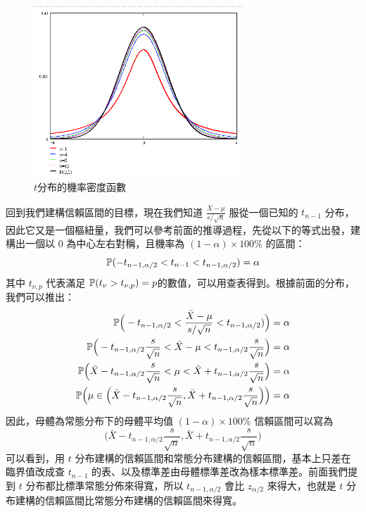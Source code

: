     \begin{figure}[htbp]
        \centering
        \includegraphics[trim={0 0 0 0.5cm},clip,width=0.7\textwidth]{figures/05-Confidence_interval/student.png}
        \caption{$t$分布的機率密度函數}
        \label{fig:student}
    \end{figure}

    回到我們建構信賴區間的目標，現在我們知道 $\frac{\bar{X}-\mu}{s/\sqrt{n}}$ 服從一個已知的 $t_{n-1}$ 分布，因此它又是一個樞紐量，我們可以參考前面的推導過程，先從以下的等式出發，建構出一個以 0 為中心左右對稱，且機率為 $(1-\alpha)\times 100\%$ 的區間：
     \[\mathbb{P}(-t_{n-1, \alpha/2} < t_{n-1} < t_{n-1, \alpha/2}) = \alpha\]
    其中 $t_{\nu, p}$ 代表滿足 $\mathbb{P}(t_{\nu} > t_{\nu, p}) = p$的數值，可以用查表得到。根據前面的分布，我們可以推出：
    \begin{align*}
        \mathbb{P}\Big(-t_{n-1, \alpha/2} < \frac{\bar{X} - \mu}{s/\sqrt{n}} < t_{n-1, \alpha/2})\Big) &= \alpha\\
        \mathbb{P}\Big(-t_{n-1, \alpha/2}\frac{s}{\sqrt{n}} < \bar{X} - \mu < t_{n-1, \alpha/2}\frac{s}{\sqrt{n}}\Big) &= \alpha\\
        \mathbb{P}\Big(\bar{X}-t_{n-1, \alpha/2}\frac{s}{\sqrt{n}}< \mu < \bar{X} + t_{n-1, \alpha/2}\frac{s}{\sqrt{n}}\Big) &= \alpha\\
        \mathbb{P}\Big(\mu \in \Big(\bar{X}-t_{n-1, \alpha/2}\frac{s}{\sqrt{n}},  \bar{X} + t_{n-1, \alpha/2}\frac{s}{\sqrt{n}}\Big)\Big) &= \alpha
    \end{align*}
    因此，母體為常態分布下的母體平均值 $(1-\alpha)\times 100\%$ 信賴區間可以寫為
    \[\Big(\bar{X}-t_{n-1, \alpha/2}\frac{s}{\sqrt{n}},  \bar{X} + t_{n-1, \alpha/2}\frac{s}{\sqrt{n}}\Big)\]
    可以看到，用 $t$ 分布建構的信賴區間和常態分布建構的信賴區間，基本上只差在臨界值改成查 $t_{n-1}$ 的表、以及標準差由母體標準差改為樣本標準差。前面我們提到 $t$ 分布都比標準常態分佈來得寬，所以 $t_{n-1, \alpha/2}$ 會比 $z_{\alpha/2}$ 來得大，也就是 $t$ 分布建構的信賴區間比常態分布建構的信賴區間來得寬。
    
